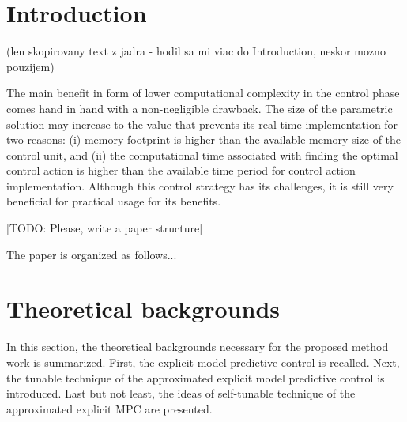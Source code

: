 \documentclass[preprint,12pt]{elsarticle}
\begin{document}

\section{Introduction}
\label{sec:introduction}
 
(len skopirovany text z jadra - hodil sa mi viac do Introduction, neskor mozno pouzijem) 

The main benefit in form of lower computational complexity in the control phase comes hand in hand with a non-negligible drawback. The size of the parametric solution may increase to the value that prevents its real-time implementation for two reasons: (i) memory footprint is higher than the available memory size of the control unit, and (ii) the computational time associated with finding the optimal control action is higher than the available time period for control action implementation. Although this control strategy has its challenges, it is still very beneficial for practical usage for its benefits. 

[TODO: Please, write a paper structure]

The paper is organized as follows...

\section{Theoretical backgrounds}
\label{sec:preliminaries}

In this section, the theoretical backgrounds necessary for the proposed method  work is summarized. First, the explicit model predictive control is recalled. Next, the tunable technique of the approximated explicit model predictive control is introduced. Last but not least, the ideas of self-tunable technique of the approximated explicit MPC are presented.
\end{document}
